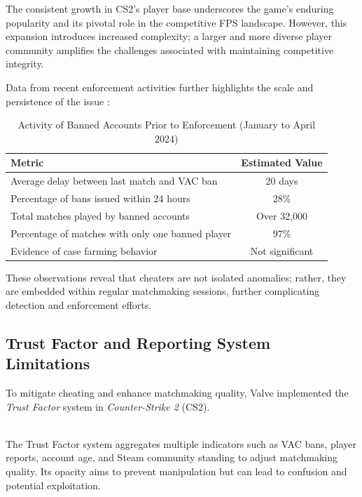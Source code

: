 The consistent growth in CS2's player base underscores the game's enduring popularity and its pivotal role in the competitive FPS landscape. However, this expansion introduces increased complexity; a larger and more diverse player community amplifies the challenges associated with maintaining competitive integrity.

\newpage

Data from recent enforcement activities further highlights the scale and persistence of the issue \parencite{csstats2024}:

\begin{table}[H]
  \centering
  \small
  \setlength{\tabcolsep}{6pt}
  \caption{Activity of Banned Accounts Prior to Enforcement (January to April 2024)}
  \label{tab:cheater-impact}
  \begin{tabular}{|p{5.2cm}|c|}
  \hline
  \textbf{Metric} & \textbf{Estimated Value} \\
  \hline
  Average delay between last match and VAC ban & 20 days \\
  \hline
  Percentage of bans issued within 24 hours & 28\% \\
  \hline
  Total matches played by banned accounts & Over 32,000 \\
  \hline
  Percentage of matches with only one banned player & 97\% \\
  \hline
  Evidence of case farming behavior & Not significant \\
  \hline
  \end{tabular}
\end{table}

These observations reveal that cheaters are not isolated anomalies; rather, they are embedded within regular matchmaking sessions, further complicating detection and enforcement efforts.

\subsection{Trust Factor and Reporting System Limitations}

To mitigate cheating and enhance matchmaking quality, Valve implemented the \textit{Trust Factor} system in \textit{Counter-Strike 2} (CS2).

\begin{tcolorbox}[colback=gray!10, colframe=gray!50, boxrule=0pt, sharp corners, width=\linewidth, left=1mm, right=1mm, top=0.5mm, bottom=0.5mm]
 \\
The Trust Factor system aggregates multiple indicators such as VAC bans, player reports, account age, and Steam community standing to adjust matchmaking quality. Its opacity aims to prevent manipulation but can lead to confusion and potential exploitation.
\end{tcolorbox}

